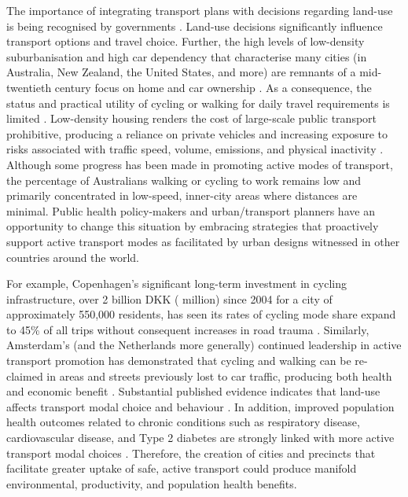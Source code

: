 \documentclass[10pt,letterpaper]{article}
\begin{document}
The importance of integrating transport plans with decisions regarding land-use is being recognised by governments \cite{ATAP2016,SAustralia2015}. Land-use decisions significantly influence transport options and travel choice. Further, the high levels of low-density suburbanisation and high car dependency that characterise many cities (in Australia, New Zealand, the United States, and more) are remnants of a mid-twentieth century focus on home and car ownership \cite{Currie2007,Dodson2008}. As a consequence, the status and practical utility of cycling or walking for daily travel requirements is limited \cite{Heesch2014,Daley2011}. Low-density housing renders the cost of large-scale public transport prohibitive, producing a reliance on private vehicles and increasing exposure to risks associated with traffic speed, volume, emissions, and physical inactivity  \cite{Cepeda2016,MingWen2008,Norman2006}. Although some progress has been made in promoting active modes of transport, the percentage of Australians walking or cycling to work remains low and primarily concentrated in low-speed, inner-city areas where distances are minimal. Public health policy-makers and urban/transport planners have an opportunity to change this situation by embracing strategies that proactively support active transport modes as facilitated by urban designs witnessed in other countries around the world.

For example, Copenhagen's significant long-term investment in cycling infrastructure, over 2 billion DKK ( million) since 2004 \cite{Copenhagen2017b} for a city of approximately 550,000 residents, has seen its rates of cycling mode share expand to 45\% of all trips without consequent increases in road trauma \cite{Kaplan2014}. Similarly, Amsterdam's (and the Netherlands more generally) continued leadership in active transport promotion has demonstrated that cycling and walking can be re-claimed in areas and streets previously lost to car traffic, producing both health and economic benefit \cite{Andersen2000}. Substantial published evidence indicates that land-use affects transport modal choice and behaviour  \cite{Giles-corti2016,Kleinert2016,Goenka2016}. In addition, improved population health outcomes related to chronic conditions such as respiratory disease, cardiovascular disease, and Type 2 diabetes are strongly linked with more active transport modal choices  \cite{Zapata-Diomedi2017}. Therefore, the creation of cities and precincts that facilitate greater uptake of safe, active transport could produce manifold environmental, productivity, and population health benefits. 
\end{document}
